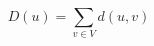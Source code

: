 \documentclass[12pt]{article}
\begin{document}
\[
D\left(u\right) = \sum_{v \in V}{d\left(u,v\right)}
\]
\end{document}
